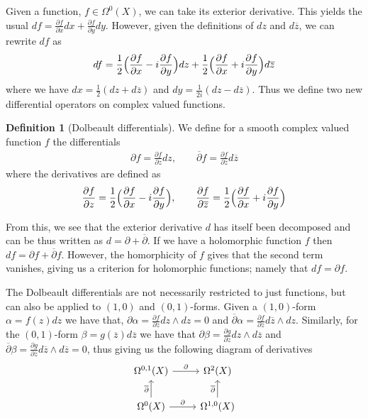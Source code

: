 \documentclass[11pt]{report}
\theoremstyle{definition}
\newtheorem{defn}[thm]{Definition}
\begin{document}
Given a function, $f \in \Omega^0(X)$, we can take its exterior derivative. This yields the usual $df = \frac{\partial f}{\partial x}dx + \frac{\partial f}{\partial y}dy$. However, given the definitions of $dz$ and $d\overline{z}$, we can rewrite $df$ as 
\[ 
  df = \frac{1}{2}\Bigl(\frac{\partial f}{\partial x} - i\frac{\partial f}{\partial y}\Bigr)dz + \frac{1}{2}\Bigl(\frac{\partial f}{\partial x} + i\frac{\partial f}{\partial y}\Bigr)d\overline{z} 
\]
where we have  $dx = \frac{1}{2}(dz+d\overline{z})$ and $dy = \frac{1}{2i}(dz - d\overline{z})$. Thus we define two new differential operators on complex valued functions.
\begin{defn}[Dolbeault differentials]
  We define for a smooth complex valued function $f$ the differentials
  \begin{align*} 
    \partial f = \frac{\partial f}{\partial z}dz, 
    \qquad 
    \overline{\partial}f = \frac{\partial f}{\partial \overline{z}}d\overline{z}
  \end{align*}
  where the derivatives are defined as \[
  \frac{\partial f}{\partial z} = \frac{1}{2}\Bigl(\frac{\partial f}{\partial x} - i\frac{\partial f}{\partial y}\Bigr), 
  \qquad 
  \frac{\partial f}{\partial \overline{z}} = \frac{1}{2}\Bigl(\frac{\partial f}{\partial x} + i\frac{\partial f}{\partial y}\Bigr)\]
\end{defn}

From this, we see that the exterior derivative $d$ has itself been decomposed and can be thus written as $d = \partial + \overline{\partial}$. If we have a holomorphic function $f$ then $df = \partial f + \overline{\partial} f$. However, the homorphicity of $f$ gives that the second term vanishes, giving us a criterion for holomorphic functions; namely that $df = \partial f$.

The Dolbeault differentials are not necessarily restricted to just functions, but can also be applied to $(1,0)$ and $(0,1)$-forms. Given a $(1,0)$-form $\alpha = f(z)dz$ we have that, $\partial\alpha = \frac{\partial f}{\partial z}dz \wedge dz = 0$ and $\overline{\partial}\alpha = \frac{\partial f}{\partial z}d\overline{z} \wedge dz$. Similarly, for the $(0,1)$-form $\beta = g(\overline{z})d\overline{z}$ we have that $\partial\beta = \frac{\partial g}{\partial z}dz \wedge d\overline{z}$ and $\overline{\partial}\beta = \frac{\partial g}{\partial \overline{z}}d\overline{z}\wedge d\overline{z}=0$, thus giving us the following diagram of derivatives
\[
  \begin{tikzcd}
    \Omega^{0,1}(X) \arrow{r}{\partial} & \Omega^2(X) \\
    \Omega^0(X) \arrow{r}{\partial}  \arrow{u}{\overline{\partial}} & \Omega^{1,0}(X) \arrow{u}{\overline{\partial}}
  \end{tikzcd}  
\]
\end{document}
